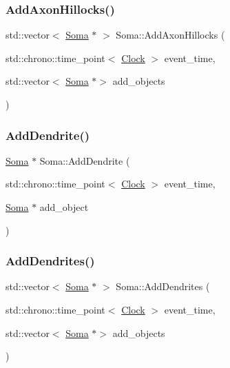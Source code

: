\mbox{\label{classSoma_a0fbede6e06b8e24a2cf22878c2f49165}} 
\subsubsection{\texorpdfstring{Add\+Axon\+Hillocks()}{AddAxonHillocks()}}
{\footnotesize\ttfamily std\+::vector$<$ \mbox{\hyperlink{classSoma}{Soma}} $\ast$ $>$ Soma\+::\+Add\+Axon\+Hillocks (\begin{DoxyParamCaption}\item[{std\+::chrono\+::time\+\_\+point$<$ \mbox{\hyperlink{universe_8h_a0ef8d951d1ca5ab3cfaf7ab4c7a6fd80}{Clock}} $>$}]{event\+\_\+time,  }\item[{std\+::vector$<$ \mbox{\hyperlink{classSoma}{Soma}} $\ast$$>$}]{add\+\_\+objects }\end{DoxyParamCaption})}

\mbox{\label{classSoma_acc198b8ec11c3f2e43d3ba9a16ce84db}} 
\subsubsection{\texorpdfstring{Add\+Dendrite()}{AddDendrite()}}
{\footnotesize\ttfamily \mbox{\hyperlink{classSoma}{Soma}} $\ast$ Soma\+::\+Add\+Dendrite (\begin{DoxyParamCaption}\item[{std\+::chrono\+::time\+\_\+point$<$ \mbox{\hyperlink{universe_8h_a0ef8d951d1ca5ab3cfaf7ab4c7a6fd80}{Clock}} $>$}]{event\+\_\+time,  }\item[{\mbox{\hyperlink{classSoma}{Soma}} $\ast$}]{add\+\_\+object }\end{DoxyParamCaption})}

\mbox{\label{classSoma_a9874f03b33413b06ca74a3143cc35331}} 
\subsubsection{\texorpdfstring{Add\+Dendrites()}{AddDendrites()}}
{\footnotesize\ttfamily std\+::vector$<$ \mbox{\hyperlink{classSoma}{Soma}} $\ast$ $>$ Soma\+::\+Add\+Dendrites (\begin{DoxyParamCaption}\item[{std\+::chrono\+::time\+\_\+point$<$ \mbox{\hyperlink{universe_8h_a0ef8d951d1ca5ab3cfaf7ab4c7a6fd80}{Clock}} $>$}]{event\+\_\+time,  }\item[{std\+::vector$<$ \mbox{\hyperlink{classSoma}{Soma}} $\ast$$>$}]{add\+\_\+objects }\end{DoxyParamCaption})}


